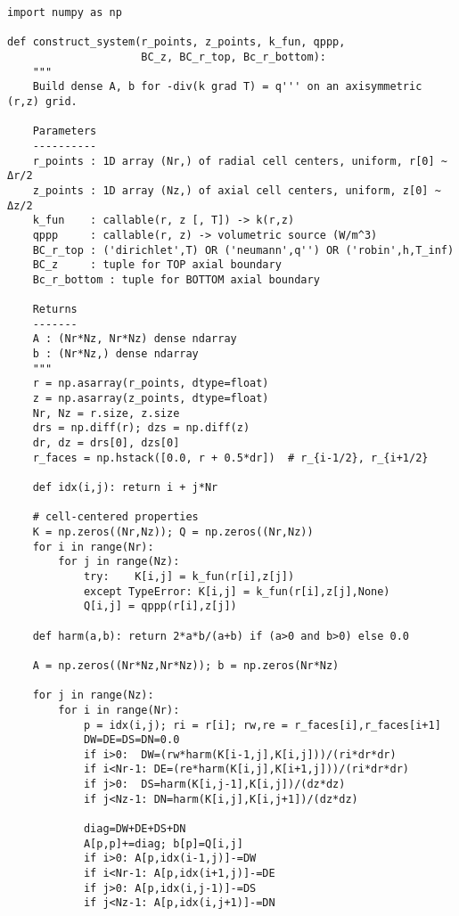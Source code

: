 \documentclass[11pt]{article}
\begin{document}
\begin{lstlisting}[caption={Bare-bones Python builder for the steady $(r,z)$ conduction system},label={lst:construct_system}]
import numpy as np

def construct_system(r_points, z_points, k_fun, qppp,
                     BC_z, BC_r_top, Bc_r_bottom):
    """
    Build dense A, b for -div(k grad T) = q''' on an axisymmetric (r,z) grid.

    Parameters
    ----------
    r_points : 1D array (Nr,) of radial cell centers, uniform, r[0] ~ Δr/2
    z_points : 1D array (Nz,) of axial cell centers, uniform, z[0] ~ Δz/2
    k_fun    : callable(r, z [, T]) -> k(r,z)
    qppp     : callable(r, z) -> volumetric source (W/m^3)
    BC_r_top : ('dirichlet',T) OR ('neumann',q'') OR ('robin',h,T_inf)
    BC_z     : tuple for TOP axial boundary
    Bc_r_bottom : tuple for BOTTOM axial boundary

    Returns
    -------
    A : (Nr*Nz, Nr*Nz) dense ndarray
    b : (Nr*Nz,) dense ndarray
    """
    r = np.asarray(r_points, dtype=float)
    z = np.asarray(z_points, dtype=float)
    Nr, Nz = r.size, z.size
    drs = np.diff(r); dzs = np.diff(z)
    dr, dz = drs[0], dzs[0]
    r_faces = np.hstack([0.0, r + 0.5*dr])  # r_{i-1/2}, r_{i+1/2}

    def idx(i,j): return i + j*Nr

    # cell-centered properties
    K = np.zeros((Nr,Nz)); Q = np.zeros((Nr,Nz))
    for i in range(Nr):
        for j in range(Nz):
            try:    K[i,j] = k_fun(r[i],z[j])
            except TypeError: K[i,j] = k_fun(r[i],z[j],None)
            Q[i,j] = qppp(r[i],z[j])

    def harm(a,b): return 2*a*b/(a+b) if (a>0 and b>0) else 0.0

    A = np.zeros((Nr*Nz,Nr*Nz)); b = np.zeros(Nr*Nz)

    for j in range(Nz):
        for i in range(Nr):
            p = idx(i,j); ri = r[i]; rw,re = r_faces[i],r_faces[i+1]
            DW=DE=DS=DN=0.0
            if i>0:  DW=(rw*harm(K[i-1,j],K[i,j]))/(ri*dr*dr)
            if i<Nr-1: DE=(re*harm(K[i,j],K[i+1,j]))/(ri*dr*dr)
            if j>0:  DS=harm(K[i,j-1],K[i,j])/(dz*dz)
            if j<Nz-1: DN=harm(K[i,j],K[i,j+1])/(dz*dz)

            diag=DW+DE+DS+DN
            A[p,p]+=diag; b[p]=Q[i,j]
            if i>0: A[p,idx(i-1,j)]-=DW
            if i<Nr-1: A[p,idx(i+1,j)]-=DE
            if j>0: A[p,idx(i,j-1)]-=DS
            if j<Nz-1: A[p,idx(i,j+1)]-=DN


\end{lstlisting}
\end{document}
